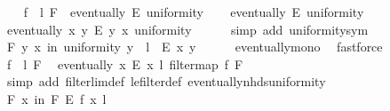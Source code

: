 \begin{isabellebody}
\ \ \isamarkupfalse%
\ {\isacartoucheopen}{\isacharparenleft}{\kern0pt}f\ {\isasymlonglongrightarrow}\ l{\isacharparenright}{\kern0pt}\ F{\isacartoucheclose}\ \ {\isacartoucheopen}eventually\ E\ uniformity{\isacartoucheclose}\isanewline
\ \ \isamarkupfalse%
\ {\isacartoucheopen}eventually\ E\ uniformity{\isacartoucheclose}\isanewline
\ \ \isamarkupfalse%
\ {\isacartoucheopen}eventually\ {\isacharparenleft}{\kern0pt}{\isasymlambda}{\isacharparenleft}{\kern0pt}x{\isacharcomma}{\kern0pt}\ y{\isacharparenright}{\kern0pt}{\isachardot}{\kern0pt}\ E\ {\isacharparenleft}{\kern0pt}y{\isacharcomma}{\kern0pt}\ x{\isacharparenright}{\kern0pt}{\isacharparenright}{\kern0pt}\ uniformity{\isacartoucheclose}\isanewline
\ \ \ \ \isamarkupfalse%
\ {\isacharparenleft}{\kern0pt}simp\ add{\isacharcolon}{\kern0pt}\ uniformity{\isacharunderscore}{\kern0pt}sym{\isacharparenright}{\kern0pt}\isanewline
\ \ \isamarkupfalse%
\ \isamarkupfalse%
\ {\isacartoucheopen}{\isasymforall}\isactrlsub F\ {\isacharparenleft}{\kern0pt}y{\isacharcomma}{\kern0pt}\ x{\isacharparenright}{\kern0pt}\ in\ uniformity{\isachardot}{\kern0pt}\ y\ {\isacharequal}{\kern0pt}\ l\ {\isasymlongrightarrow}\ E\ {\isacharparenleft}{\kern0pt}x{\isacharcomma}{\kern0pt}\ y{\isacharparenright}{\kern0pt}{\isacartoucheclose}\isanewline
\ \ \ \ \isamarkupfalse%
\ eventually{\isacharunderscore}{\kern0pt}mono\ \isamarkupfalse%
\ fastforce\isanewline
\ \ \isamarkupfalse%
\ {\isacartoucheopen}{\isacharparenleft}{\kern0pt}f\ {\isasymlonglongrightarrow}\ l{\isacharparenright}{\kern0pt}\ F{\isacartoucheclose}\ \isamarkupfalse%
\ {\isacartoucheopen}eventually\ {\isacharparenleft}{\kern0pt}{\isasymlambda}x{\isachardot}{\kern0pt}\ E\ {\isacharparenleft}{\kern0pt}x\ {\isacharcomma}{\kern0pt}l{\isacharparenright}{\kern0pt}{\isacharparenright}{\kern0pt}\ {\isacharparenleft}{\kern0pt}filtermap\ f\ F{\isacharparenright}{\kern0pt}{\isacartoucheclose}\isanewline
\ \ \ \ \isamarkupfalse%
\ {\isacharparenleft}{\kern0pt}simp\ add{\isacharcolon}{\kern0pt}\ filterlim{\isacharunderscore}{\kern0pt}def\ le{\isacharunderscore}{\kern0pt}filter{\isacharunderscore}{\kern0pt}def\ eventually{\isacharunderscore}{\kern0pt}nhds{\isacharunderscore}{\kern0pt}uniformity{\isacharparenright}{\kern0pt}\isanewline
\ \ \isamarkupfalse%
\ \isamarkupfalse%
\ {\isacartoucheopen}{\isasymforall}\isactrlsub F\ x\ in\ F{\isachardot}{\kern0pt}\ E\ {\isacharparenleft}{\kern0pt}f\ x{\isacharcomma}{\kern0pt}\ l{\isacharparenright}{\kern0pt}{\isacartoucheclose}\isanewline

\end{isabellebody}
